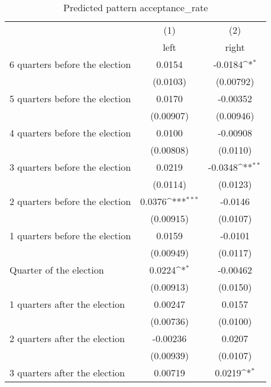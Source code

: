 \begin{table}[htbp]\centering
\def\sym#1{\ifmmode^{#1}\else\(^{#1}\)\fi}
\caption{Predicted pattern acceptance\_rate}
\begin{tabular}{l*{2}{c}}
\hline\hline
                    &\multicolumn{1}{c}{(1)}&\multicolumn{1}{c}{(2)}\\
                    &\multicolumn{1}{c}{left}&\multicolumn{1}{c}{right}\\
\hline
 6 quarters before the election&      0.0154         &     -0.0184\sym{*}  \\
                    &    (0.0103)         &   (0.00792)         \\
[1em]
 5 quarters before the election&      0.0170         &    -0.00352         \\
                    &   (0.00907)         &   (0.00946)         \\
[1em]
 4 quarters before the election&      0.0100         &    -0.00908         \\
                    &   (0.00808)         &    (0.0110)         \\
[1em]
 3 quarters before the election&      0.0219         &     -0.0348\sym{**} \\
                    &    (0.0114)         &    (0.0123)         \\
[1em]
 2 quarters before the election&      0.0376\sym{***}&     -0.0146         \\
                    &   (0.00915)         &    (0.0107)         \\
[1em]
 1 quarters before the election&      0.0159         &     -0.0101         \\
                    &   (0.00949)         &    (0.0117)         \\
[1em]
Quarter of the election&      0.0224\sym{*}  &    -0.00462         \\
                    &   (0.00913)         &    (0.0150)         \\
[1em]
 1 quarters after the election&     0.00247         &      0.0157         \\
                    &   (0.00736)         &    (0.0100)         \\
[1em]
 2 quarters after the election&    -0.00236         &      0.0207         \\
                    &   (0.00939)         &    (0.0107)         \\
[1em]
 3 quarters after the election&     0.00719         &      0.0219\sym{*}  \\

\end{tabular}
\end{table}
